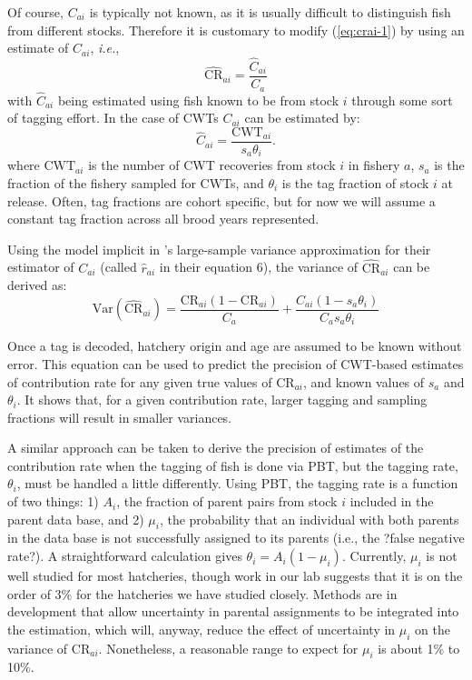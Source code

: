 \documentclass[11pt]{article}
\newcommand{\ie}{{\em i.e.},\xspace }
\newcommand{\CR}{\mathrm{CR}}
\newcommand{\CWT}{\mathrm{CWT}}
\newcommand{\Var}{\mathrm{Var}}
\begin{document}
Of course, $C_{ai}$ is typically not known, as it is usually difficult to distinguish fish from different stocks. 
Therefore it is customary to modify (\ref{eq:crai-1}) by using an estimate of $C_{ai}$, \ie 
\begin{equation}
\widehat{\CR}_{ai} = \frac{\widehat{C}_{ai}}{C_a}
\label{eq:crai-2}
\end{equation}
with  $\widehat{C}_{ai}$ being estimated using fish known to be from stock $i$ through some sort of tagging
effort.  In the case of CWTs  $C_{ai}$ can be estimated by:
\begin{equation}
\widehat{C}_{ai} = \frac{\CWT_{ai}}{s_a\theta_i}.
\end{equation}
where $\CWT_{ai}$ is the number of CWT recoveries from stock $i$ in fishery $a$, $s_a$ is the
fraction of the fishery sampled 
for CWTs, and $\theta_i$ is the tag fraction of stock $i$ at release. Often, tag fractions are
cohort specific, but for now we will assume a constant tag fraction across all brood 
years represented.


Using the model implicit in \citet{Ber&Cla1996}'s large-sample variance approximation for
their estimator of $C_{ai}$ (called $\hat{r}_{ai}$ in their equation 6), the variance of
$\widehat{\CR}_{ai}$ can be derived as:
\begin{equation}
\Var(\widehat{\CR}_{ai}) = 
\frac{ \CR_{ai} (1 - \CR_{ai})}{C_a} +
\frac{C_{ai}(1 - s_a\theta_i)}{C_a s_a \theta_i}
\label{eq:cwt-var}
\end{equation}

Once  a tag is decoded, hatchery origin and age are assumed to be known without error. This equation can be 
used to predict the precision of CWT-based estimates of contribution rate for any given true values of $\CR_{ai}$, and 
known values of $s_a$ and $\theta_i$. It shows that, for a given contribution rate, larger tagging and sampling fractions will 
result in smaller variances.


A similar approach can be taken to derive the precision of estimates of the contribution rate when the tagging of 
fish is done via PBT, but the tagging rate, $\theta_i$, must be handled a little differently. Using PBT, the tagging rate is a 
function of two things: 1) $A_i$, the fraction of parent pairs from stock $i$ included in the parent data base, and 2) $\mu_i$, 
the probability that an individual with both parents in the data base is not successfully assigned to its parents 
(i.e., the ?false negative rate?). A straightforward calculation gives $\theta_i = A_i(1-\mu_i)$. Currently, $\mu_i$
is not well studied for 
most hatcheries, though work in our lab suggests that it is on the order of 3\% for the hatcheries we have 
studied closely. Methods are in 
development that allow uncertainty in parental assignments to be integrated into the estimation, which will, anyway, 
reduce the effect of uncertainty in $\mu_i$ on the variance of $\CR_{ai}$. Nonetheless, a reasonable range
to expect for $\mu_i$ is about 1\% to 10\%.
\end{document}
